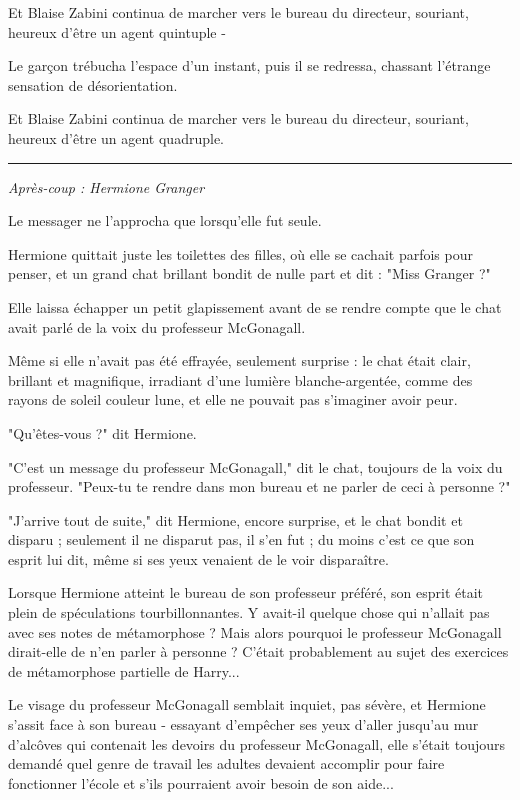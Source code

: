 Et Blaise Zabini continua de marcher vers le bureau du directeur, souriant, heureux d'être un agent quintuple -

Le garçon trébucha l'espace d'un instant, puis il se redressa, chassant l'étrange sensation de désorientation.

Et Blaise Zabini continua de marcher vers le bureau du directeur, souriant, heureux d'être un agent quadruple.
\par\noindent\rule{\textwidth}{0.4pt}
\emph{Après-coup : Hermione Granger} 

Le messager ne l'approcha que lorsqu'elle fut seule.

Hermione quittait juste les toilettes des filles, où elle se cachait parfois pour penser, et un grand chat brillant bondit de nulle part et dit : "Miss Granger ?"

Elle laissa échapper un petit glapissement avant de se rendre compte que le chat avait parlé de la voix du professeur McGonagall.

Même si elle n'avait pas été effrayée, seulement surprise : le chat était clair, brillant et magnifique, irradiant d'une lumière blanche-argentée, comme des rayons de soleil couleur lune, et elle ne pouvait pas s'imaginer avoir peur.

"Qu'êtes-vous ?" dit Hermione.

"C'est un message du professeur McGonagall," dit le chat, toujours de la voix du professeur. "Peux-tu te rendre dans mon bureau et ne parler de ceci à personne ?"

"J'arrive tout de suite," dit Hermione, encore surprise, et le chat bondit et disparu ; seulement il ne disparut pas, il s'en fut ; du moins c'est ce que son esprit lui dit, même si ses yeux venaient de le voir disparaître.

Lorsque Hermione atteint le bureau de son professeur préféré, son esprit était plein de spéculations tourbillonnantes. Y avait-il quelque chose qui n'allait pas avec ses notes de métamorphose ? Mais alors pourquoi le professeur McGonagall dirait-elle de n'en parler à personne ? C'était probablement au sujet des exercices de métamorphose partielle de Harry...

Le visage du professeur McGonagall semblait inquiet, pas sévère, et Hermione s'assit face à son bureau - essayant d'empêcher ses yeux d'aller jusqu'au mur d'alcôves qui contenait les devoirs du professeur McGonagall, elle s'était toujours demandé quel genre de travail les adultes devaient accomplir pour faire fonctionner l'école et s'ils pourraient avoir besoin de son aide...

